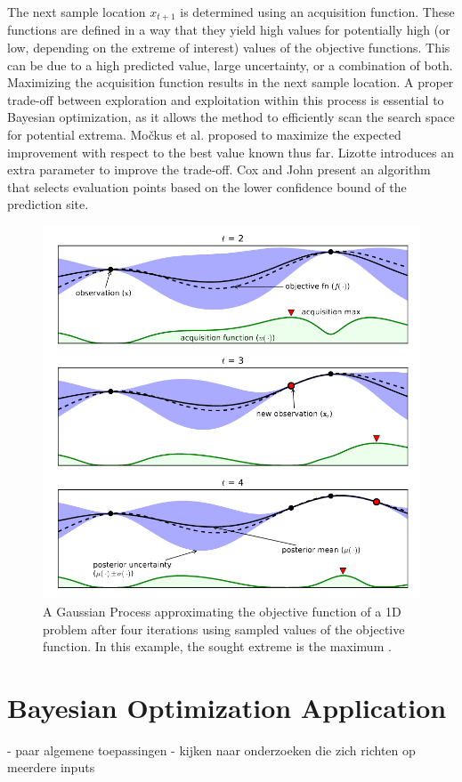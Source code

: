 The next sample location $x_{t+1}$ is determined using an acquisition function. These functions are defined in a way that they yield high values for potentially high (or low, depending on the extreme of interest) values of the objective functions. This can be due to a high predicted value, large uncertainty, or a combination of both. Maximizing the acquisition function results in the next sample location. A proper trade-off between exploration and exploitation within this process is essential to Bayesian optimization, as it allows the method to efficiently scan the search space for potential extrema. 
Močkus et al. \cite{Mockus1978} proposed to maximize the expected improvement with respect to the best value known thus far. Lizotte \cite{Lizotte2008} introduces an extra parameter to improve the trade-off. Cox and John \cite{CoxJohn1997} present an algorithm that selects evaluation points based on the lower confidence bound of the prediction site. 

\begin{figure}[h]
    \centering
    \includegraphics[width=0.6\linewidth]{Literature Survey - DCSC template/figuresLIT/BayesianOptmization.png}
    \caption{A Gaussian Process approximating the objective function of a 1D problem after four iterations using sampled values of the objective function. In this example, the sought extreme is the maximum \cite{bo_tutorial}.}
    \label{fig::BO}
\end{figure}

\section{Bayesian Optimization Application}
- paar algemene toepassingen
- kijken naar onderzoeken die zich richten op meerdere inputs


